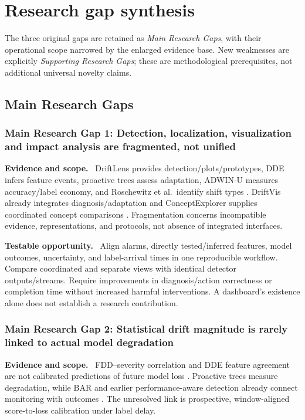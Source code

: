 \documentclass[10pt,a4paper]{article}
\newcommand{\lead}[1]{\textbf{#1}\ }
\begin{document}
\clearpage
\section{Research gap synthesis}
The three original gaps are retained as \emph{Main Research Gaps}, with their operational scope narrowed by the enlarged evidence base. New weaknesses are explicitly \emph{Supporting Research Gaps}; these are methodological prerequisites, not additional universal novelty claims.

\subsection{Main Research Gaps}
\subsubsection*{Main Research Gap 1: Detection, localization, visualization and impact analysis are fragmented, not unified}
\lead{Evidence and scope.}
DriftLens provides detection/plots/prototypes, DDE infers feature events, proactive trees assess adaptation, ADWIN-U measures accuracy/label economy, and Roschewitz et al.\ identify shift types \cite{greco,szucs,guerrero,assis,roschewitz}. DriftVis already integrates diagnosis/adaptation and ConceptExplorer supplies coordinated concept comparisons \cite{driftvis,conceptexplorer}. Fragmentation concerns incompatible evidence, representations, and protocols, not absence of integrated interfaces.

\lead{Testable opportunity.}
Align alarms, directly tested/inferred features, model outcomes, uncertainty, and label-arrival times in one reproducible workflow. Compare coordinated and separate views with identical detector outputs/streams. Require improvements in diagnosis/action correctness or completion time without increased harmful interventions. A dashboard's existence alone does not establish a research contribution.

\subsubsection*{Main Research Gap 2: Statistical drift magnitude is rarely linked to actual model degradation}
\lead{Evidence and scope.}
FDD--severity correlation and DDE feature agreement are not calibrated predictions of future model loss \cite{greco,szucs}. Proactive trees measure degradation, while BAR and earlier performance-aware detection already connect monitoring with outcomes \cite{guerrero,assis,bayram,lukats}. The unresolved link is prospective, window-aligned score-to-loss calibration under label delay.
\end{document}
